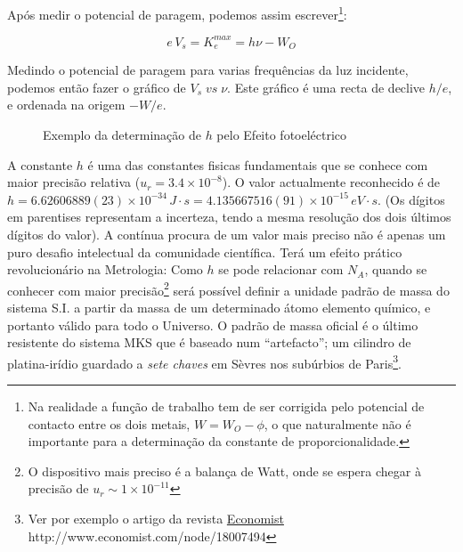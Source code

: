 \documentclass[a4paper,12pt]{article}  %
\begin{document}
 Após medir o potencial de paragem, podemos assim escrever\footnote{Na realidade a função de trabalho tem de ser corrigida pelo potencial de contacto entre os dois metais, $W=W_O - \phi$, o que naturalmente não é importante para a determinação da constante de proporcionalidade.}:

\begin{equation}
	\label{eq:energia}
	e\,V_s= K_e^{max}= h \nu - W_O
\end{equation}

Medindo o potencial de paragem para varias frequências da luz incidente, podemos então fazer o gráfico de $V_s\; vs \;\nu$. Este gráfico é uma recta de declive $h/e$, e ordenada na origem  $-W/e$.


\begin{figure}[htb]   
\begin{center}
  \sansmath

	\caption{Exemplo da determinação de $h$ pelo Efeito fotoeléctrico}
	 \label{fig:hplot} 
	\end{center}
\end{figure}

A constante $h$ é uma das constantes fisicas fundamentais que se conhece com maior precisão relativa ($u_r = 3.4\times 10^{-8}$). 
O valor actualmente reconhecido é de $h=6.62606889(23) \times 10^{-34}\,J\cdot s=4.135667516(91)\times 10^{-15}\,eV\cdot s$. 
(Os  dígitos em parentises representam a incerteza, tendo a mesma resolução dos dois últimos dígitos do valor). 
A contínua procura de um valor mais preciso não é apenas um puro desafio intelectual da comunidade científica.
 Terá um efeito prático revolucionário na Metrologia: 
 Como $h$ se pode relacionar com $N_A$, quando se conhecer com maior precisão\footnote{O dispositivo mais preciso é a balança de Watt, onde se espera chegar à precisão de $u_r \sim 1\times 10^{-11}$} será possível definir a unidade padrão de massa do sistema S.I. a partir da massa de um determinado átomo elemento químico, e portanto válido para todo o Universo. 
 O padrão de massa oficial é o último resistente do sistema MKS que é baseado num ``artefacto''; 
 um cilindro de platina-irídio guardado a \emph{sete chaves} em Sèvres nos subúrbios de Paris\footnote{Ver por exemplo o artigo da revista \href{http://www.economist.com/node/18007494}{Economist} http://www.economist.com/node/18007494}.   
 
\end{document}
